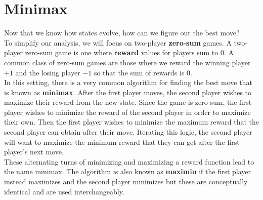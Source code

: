 \documentclass[12pt, letterpaper]{article}
\begin{document}
\section*{Minimax}
Now that we know how states evolve, how can we figure out the best move? \\[0.2cm]
To simplify our analysis, we will focus on two-player \textbf{zero-sum} games. A two-player zero-sum game is one where \textbf{reward} values for players sum to $0$. A common class of zero-sum games are those where we reward the winning player $+1$ and the losing player $-1$ so that the sum of rewards is $0$. \\[0.2cm]
In this setting, there is a very common algorithm for finding the best move that is known as \textbf{minimax}. After the first player moves, the second player wishes to maximize their reward from the new state. Since the game is zero-sum, the first player wishes to minimize the reward of the second player in order to maximize their own. Then the first player wishes to minimize the maximum reward that the second player can obtain after their move. Iterating this logic, the second player will want to maximize the minimum reward that they can get after the first player's next move. \\[0.2cm]
These alternating turns of minimizing and maximizing a reward function lead to the name minimax. The algorithm is also known as \textbf{maximin} if the first player instead maximizes and the second player minimizes but these are conceptually identical and are used interchangeably.
\newpage
\end{document}
